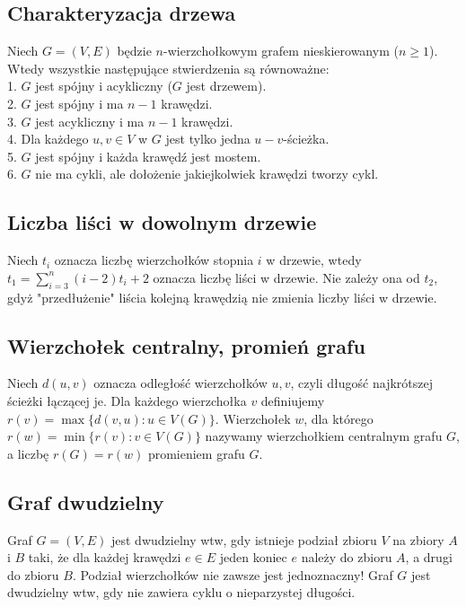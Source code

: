 \subsection*{Charakteryzacja drzewa}
Niech $G = (V, E)$ będzie $n$-wierzchołkowym grafem nieskierowanym ($n \geq 1$).
Wtedy wszystkie następujące stwierdzenia są równoważne: \\
1. $G$ jest spójny i acykliczny ($G$ jest drzewem). \\
2. $G$ jest spójny i ma $n-1$ krawędzi. \\
3. $G$ jest acykliczny i ma $n-1$ krawędzi. \\
4. Dla każdego $u, v \in V$ w $G$ jest tylko jedna $u-v$-ścieżka. \\
5. $G$ jest spójny i każda krawędź jest mostem. \\
6. $G$ nie ma cykli, ale dołożenie jakiejkolwiek krawędzi tworzy cykl.

\subsection*{Liczba liści w dowolnym drzewie}
Niech $t_i$ oznacza liczbę wierzchołków stopnia $i$ w drzewie, wtedy \\
$t_1 = \sum\limits_{i=3}^{n} (i-2)t_i + 2$
oznacza liczbę liści w drzewie. Nie zależy ona od $t_2$, gdyż "przedłużenie"
liścia kolejną krawędzią nie zmienia liczby liści w drzewie.

\subsection*{Wierzchołek centralny, promień grafu}
Niech $d(u,v)$ oznacza odległość wierzchołków $u, v$, czyli długość najkrótszej
ścieżki łączącej je. Dla każdego wierzchołka $v$ definiujemy \\
$r(v) = \max \{ d(v, u) : u \in V(G) \}$. Wierzchołek $w$, dla którego 
$r(w) = \min \{ r(v) : v \in V(G) \}$ nazywamy wierzchołkiem centralnym grafu
$G$, a liczbę $r(G) = r(w)$ promieniem grafu $G$.

\subsection*{Graf dwudzielny}
Graf $G = (V, E)$ jest dwudzielny wtw, gdy istnieje podział zbioru $V$ na 
zbiory $A$ i $B$ taki, że dla każdej krawędzi $e \in E$ jeden koniec $e$
należy do zbioru $A$, a drugi do zbioru $B$. Podział wierzchołków nie zawsze
jest jednoznaczny! Graf $G$ jest dwudzielny wtw, gdy nie zawiera cyklu 
o nieparzystej długości.

